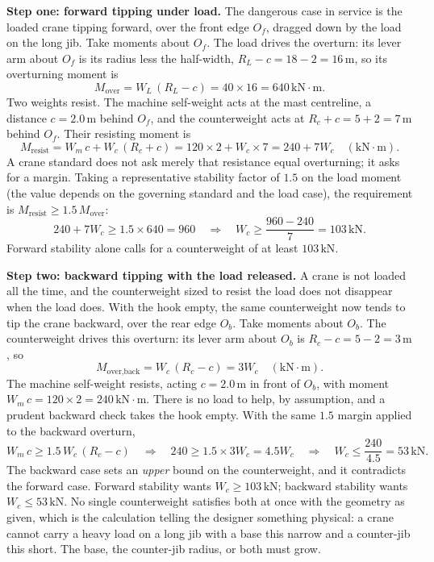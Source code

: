 \textbf{Step one: forward tipping under load.} The dangerous case in service
is the loaded crane tipping forward, over the front edge $O_f$, dragged down
by the load on the long jib. Take moments about $O_f$. The load drives the
overturn: its lever arm about $O_f$ is its radius less the half-width,
$R_L - c = 18 - 2 = 16\,\si{\meter}$, so its overturning moment is
\[
M_{\text{over}} = W_L\,(R_L - c) = 40 \times 16 = 640\,\text{kN}\cdot\text{m}.
\]
Two weights resist. The machine self-weight acts at the mast centreline, a
distance $c = 2.0\,\si{\meter}$ behind $O_f$, and the counterweight acts at
$R_c + c = 5 + 2 = 7\,\si{\meter}$ behind $O_f$. Their resisting moment is
\[
M_{\text{resist}} = W_m\,c + W_c\,(R_c + c) = 120 \times 2 + W_c \times 7
= 240 + 7 W_c \quad(\text{kN}\cdot\text{m}).
\]
A crane standard does not ask merely that resistance equal overturning; it
asks for a margin. Taking a representative stability factor of $1.5$ on the
load moment (the value depends on the governing standard and the load case),
the requirement is $M_{\text{resist}} \ge 1.5\,M_{\text{over}}$:
\[
240 + 7 W_c \ge 1.5 \times 640 = 960
\quad\Longrightarrow\quad
W_c \ge \frac{960 - 240}{7} = 103\,\text{kN}.
\]
Forward stability alone calls for a counterweight of at least $103\,\text{kN}$.

\textbf{Step two: backward tipping with the load released.} A crane is not
loaded all the time, and the counterweight sized to resist the load does not
disappear when the load does. With the hook empty, the same counterweight now
tends to tip the crane backward, over the rear edge $O_b$. Take moments about
$O_b$. The counterweight drives this overturn: its lever arm about $O_b$ is
$R_c - c = 5 - 2 = 3\,\si{\meter}$, so
\[
M_{\text{over,back}} = W_c\,(R_c - c) = 3 W_c \quad(\text{kN}\cdot\text{m}).
\]
The machine self-weight resists, acting $c = 2.0\,\si{\meter}$ in front of
$O_b$, with moment $W_m\,c = 120 \times 2 = 240\,\text{kN}\cdot\text{m}$.
There is no load to help, by assumption, and a prudent backward check takes
the hook empty. With the same $1.5$ margin applied to the backward overturn,
\[
W_m\,c \ge 1.5\,W_c\,(R_c - c)
\quad\Longrightarrow\quad
240 \ge 1.5 \times 3 W_c = 4.5 W_c
\quad\Longrightarrow\quad
W_c \le \frac{240}{4.5} = 53\,\text{kN}.
\]
The backward case sets an \emph{upper} bound on the counterweight, and it
contradicts the forward case. Forward stability wants $W_c \ge 103\,\text{kN}$;
backward stability wants $W_c \le 53\,\text{kN}$. No single counterweight
satisfies both at once with the geometry as given, which is the calculation
telling the designer something physical: a crane cannot carry a heavy load on
a long jib with a base this narrow and a counter-jib this short. The base, the
counter-jib radius, or both must grow.

